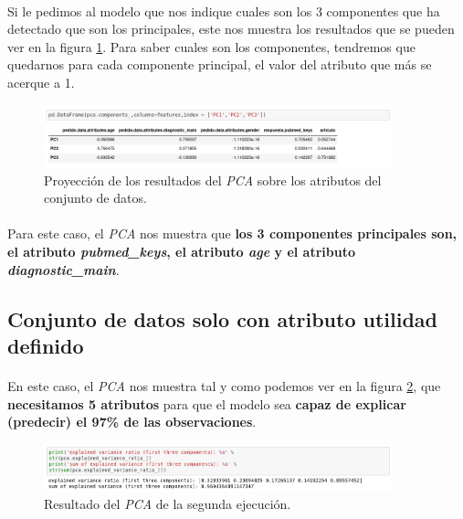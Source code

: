 \paragraph{}
Si le pedimos al modelo que nos indique cuales son los 3 componentes que ha detectado que son los principales, este nos muestra los resultados que se pueden ver en la figura \ref{pcaOneAtributos}. Para saber cuales son los componentes, tendremos que quedarnos para cada componente principal, el valor del atributo que más se acerque a 1.

\begin{figure}[!htb]
  \centering
    \includegraphics[width=0.9\textwidth]{images/resultados_procesado_de_datos_pca1_atributos.png}
    \caption{Proyección de los resultados del \textit{PCA} sobre los atributos del conjunto de datos.}
  \label{pcaOneAtributos}
\end{figure}

\paragraph{}
Para este caso, el \textit{PCA} nos muestra que \textbf{los 3 componentes principales son, el atributo \textit{pubmed\_keys}, el atributo \textit{age} y el atributo \textit{diagnostic\_main}}.

\subsection{Conjunto de datos solo con atributo utilidad definido}
\label{result:pca_case2}
\paragraph{}
En este caso, el \textit{PCA} nos muestra tal y como podemos ver en la figura \ref{pcaTwoResult}, que \textbf{necesitamos 5 atributos} para que el modelo sea \textbf{capaz de explicar (predecir) el 97\% de las observaciones}.

\begin{figure}[!htb]
  \centering
    \includegraphics[width=0.9\textwidth]{images/resultados_procesado_de_datos_pca2_result.png}
    \caption{Resultado del \textit{PCA} de la segunda ejecución.}
  \label{pcaTwoResult}
\end{figure}

